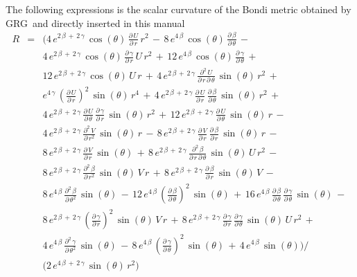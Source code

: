 \documentclass[twoside,openright]{report}
\newcommand{\grg}{{\sc GRG}}
\begin{document}
The following expressions is the scalar curvature of the
Bondi metric obtained by \grg\ and directly inserted in
this manual
\begin{eqnarray*}
R &= &
\bigl(4\,e^{2\,\beta\,+\,2\,\gamma}\,\cos(\theta)\,\frac{\partial\,U}{\partial\,r}\,r^2\,-\,8\,e^{4\,\beta}\,\cos(\theta)\,\frac{\partial\,\beta}{\partial\,\theta}\,-\,\\
&&4\,e^{2\,\beta\,+\,2\,\gamma}\,\cos(\theta)\,\frac{\partial\,\gamma}{\partial\,r}\,U\,r^2\,+\,12\,e^{4\,\beta}\,\cos(\theta)\,\frac{\partial\,\gamma}{\partial\,\theta}\,+\,\\
&&12\,e^{2\,\beta\,+\,2\,\gamma}\,\cos(\theta)\,U\,r\,+\,4\,e^{2\,\beta\,+\,2\,\gamma}\,\frac{\partial^2\,U}{\partial\,r\,\partial\,\theta}\,\sin(\theta)\,r^2\,+\,\\
&&e^{4\,\gamma}\,(\frac{\partial\,U}{\partial\,r})^2\,\sin(\theta)\,r^4\,+\,4\,e^{2\,\beta\,+\,2\,\gamma}\,\frac{\partial\,U}{\partial\,r}\,\frac{\partial\,\beta}{\partial\,\theta}\,\sin(\theta)\,r^2\,+\,\\
&&4\,e^{2\,\beta\,+\,2\,\gamma}\,\frac{\partial\,U}{\partial\,\theta}\,\frac{\partial\,\gamma}{\partial\,r}\,\sin(\theta)\,r^2\,+\,12\,e^{2\,\beta\,+\,2\,\gamma}\,\frac{\partial\,U}{\partial\,\theta}\,\sin(\theta)\,r\,-\,\\
&&4\,e^{2\,\beta\,+\,2\,\gamma}\,\frac{\partial^2\,V}{\partial\,r^2}\,\sin(\theta)\,r\,-\,8\,e^{2\,\beta\,+\,2\,\gamma}\,\frac{\partial\,V}{\partial\,r}\,\frac{\partial\,\beta}{\partial\,r}\,\sin(\theta)\,r\,-\,\\
&&8\,e^{2\,\beta\,+\,2\,\gamma}\,\frac{\partial\,V}{\partial\,r}\,\sin(\theta)\,+\,8\,e^{2\,\beta\,+\,2\,\gamma}\,\frac{\partial^2\,\beta}{\partial\,r\,\partial\,\theta}\,\sin(\theta)\,U\,r^2\,-\,\\
&&8\,e^{2\,\beta\,+\,2\,\gamma}\,\frac{\partial^2\,\beta}{\partial\,r^2}\,\sin(\theta)\,V\,r\,+\,8\,e^{2\,\beta\,+\,2\,\gamma}\,\frac{\partial\,\beta}{\partial\,r}\,\sin(\theta)\,V\,-\,\\
&&8\,e^{4\,\beta}\,\frac{\partial^2\,\beta}{\partial\,\theta^2}\,\sin(\theta)\,-\,12\,e^{4\,\beta}\,(\frac{\partial\,\beta}{\partial\,\theta})^2\,\sin(\theta)\,+\,16\,e^{4\,\beta}\,\frac{\partial\,\beta}{\partial\,\theta}\,\frac{\partial\,\gamma}{\partial\,\theta}\,\sin(\theta)\,-\,\\
&&8\,e^{2\,\beta\,+\,2\,\gamma}\,(\frac{\partial\,\gamma}{\partial\,r})^2\,\sin(\theta)\,V\,r\,+\,8\,e^{2\,\beta\,+\,2\,\gamma}\,\frac{\partial\,\gamma}{\partial\,r}\,\frac{\partial\,\gamma}{\partial\,\theta}\,\sin(\theta)\,U\,r^2\,+\,\\
&&4\,e^{4\,\beta}\,\frac{\partial^2\,\gamma}{\partial\,\theta^2}\,\sin(\theta)\,-\,8\,e^{4\,\beta}\,(\frac{\partial\,\gamma}{\partial\,\theta})^2\,\sin(\theta)\,+\,4\,e^{4\,\beta}\,\sin(\theta)\bigr)/\\
&&\bigl(2\,e^{4\,\beta\,+\,2\,\gamma}\,\sin(\theta)\,r^2\bigr)
\end{eqnarray*}
\end{document}
